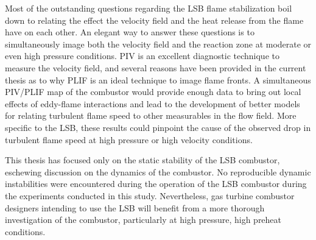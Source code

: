 Most of the outstanding questions regarding the LSB flame stabilization boil down to relating the effect the velocity field and the heat release from the flame have on each other.
An elegant way to answer these questions is to simultaneously image both the velocity field and the reaction zone at moderate or even high pressure conditions.
PIV is an excellent diagnostic technique to measure the velocity field, and several reasons have been provided in the current thesis as to why PLIF is an ideal technique to image flame fronts.
A simultaneous PIV/PLIF map of the combustor would provide enough data to bring out local effects of eddy-flame interactions and lead to the development of better models for relating turbulent flame speed to other measurables in the flow field.
More specific to the LSB, these results could pinpoint the cause of the observed drop in turbulent flame speed at high pressure or high velocity conditions.

This thesis has focused only on the static stability of the LSB combustor, eschewing discussion on the dynamics of the combustor.
No reproducible dynamic instabilities were encountered during the operation of the LSB combustor during the experiments conducted in this study.
Nevertheless, gas turbine combustor designers intending to use the LSB will benefit from a more thorough investigation of the combustor, particularly at high pressure, high preheat conditions.

